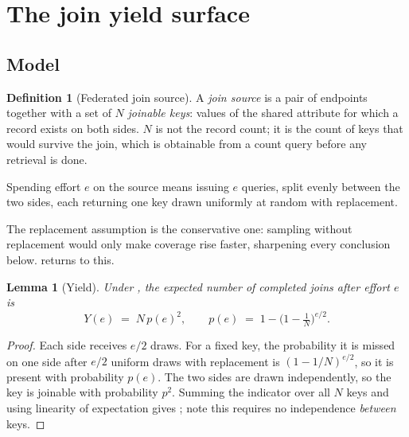 \documentclass[11pt,twocolumn,a4paper]{article}
\theoremstyle{thmstyle}
\newtheorem{lemma}[theorem]{Lemma}
\theoremstyle{definition}
\newtheorem{definition}[theorem]{Definition}
\theoremstyle{remark}
\newcommand{\eff}{e}
\newcommand{\yield}{Y}
\begin{document}
\section{The join yield surface}
\label{sec:surface}

\subsection{Model}

\begin{definition}[Federated join source]
\label{def:source}
A \emph{join source} is a pair of endpoints together with a set of $N$
\emph{joinable keys}: values of the shared attribute for which a record
exists on both sides. $N$ is not the record count; it is the count of
keys that would survive the join, which is obtainable from a count query
before any retrieval is done.

Spending effort $\eff$ on the source means issuing $\eff$ queries, split
evenly between the two sides, each returning one key drawn uniformly at
random with replacement.
\end{definition}

The replacement assumption is the conservative one: sampling without
replacement would only make coverage rise faster, sharpening every
conclusion below.  returns to this.

\begin{lemma}[Yield]
\label{lem:yield}
Under , the expected number of completed joins after
effort $\eff$ is
\begin{equation}
\label{eq:yield}
\yield(\eff) \;=\; N\,p(\eff)^{2},
\qquad
p(\eff) \;=\; 1-\Big(1-\tfrac{1}{N}\Big)^{\eff/2}.
\end{equation}
\end{lemma}

\begin{proof}
Each side receives $\eff/2$ draws. For a fixed key, the probability it
is missed on one side after $\eff/2$ uniform draws with replacement is
$(1-1/N)^{\eff/2}$, so it is present with probability $p(\eff)$. The two
sides are drawn independently, so the key is joinable with probability
$p^{2}$. Summing the indicator over all $N$ keys and using linearity of
expectation gives ; note this requires no independence
\emph{between} keys.
\end{proof}
\end{document}
